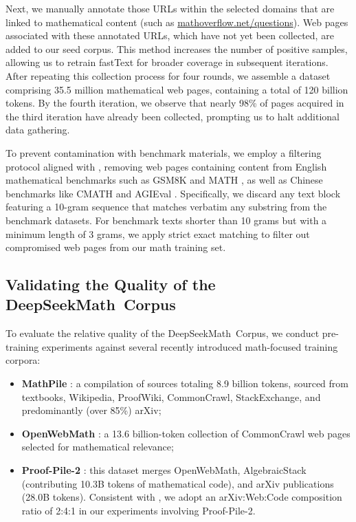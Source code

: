 Next, we manually annotate those URLs within the selected domains that are linked to mathematical content (such as \url{mathoverflow.net/questions}). Web pages associated with these annotated URLs, which have not yet been collected, are added to our seed corpus. This method increases the number of positive samples, allowing us to retrain fastText for broader coverage in subsequent iterations. After repeating this collection process for four rounds, we assemble a dataset comprising 35.5 million mathematical web pages, containing a total of 120 billion tokens. By the fourth iteration, we observe that nearly 98\% of pages acquired in the third iteration have already been collected, prompting us to halt additional data gathering.

To prevent contamination with benchmark materials, we employ a filtering protocol aligned with \cite{deepseek-coder}, removing web pages containing content from English mathematical benchmarks such as GSM8K \citep{gsm8k} and MATH \citep{MATH}, as well as Chinese benchmarks like CMATH \citep{wei2023cmath} and AGIEval \citep{agieval}. Specifically, we discard any text block featuring a 10-gram sequence that matches verbatim any substring from the benchmark datasets. For benchmark texts shorter than 10 grams but with a minimum length of 3 grams, we apply strict exact matching to filter out compromised web pages from our math training set.

\subsection{Validating the Quality of the DeepSeekMath~Corpus}

To evaluate the relative quality of the DeepSeekMath~Corpus, we conduct pre-training experiments against several recently introduced math-focused training corpora:

\begin{itemize}[topsep=0pt]
    \item \textbf{MathPile} \citep{mathpile}: a compilation of sources totaling 8.9 billion tokens, sourced from textbooks, Wikipedia, ProofWiki, CommonCrawl, StackExchange, and predominantly (over 85\%) arXiv;
    \item \textbf{OpenWebMath} \citep{openwebmath}: a 13.6 billion-token collection of CommonCrawl web pages selected for mathematical relevance;
    \item \textbf{Proof-Pile-2} \citep{llemma}: this dataset merges OpenWebMath, AlgebraicStack (contributing 10.3B tokens of mathematical code), and arXiv publications (28.0B tokens). Consistent with \cite{llemma}, we adopt an arXiv:Web:Code composition ratio of 2:4:1 in our experiments involving Proof-Pile-2.
\end{itemize}

